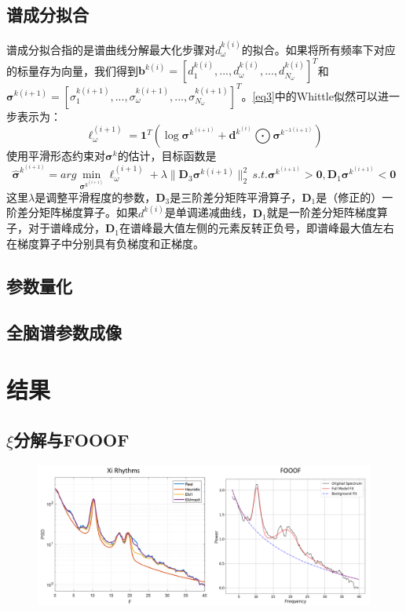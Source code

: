 \subsection{谱成分拟合}
谱成分拟合指的是谱曲线分解最大化步骤对$d_\omega^{k(i)}$的拟合。如果将所有频率下对应的标量存为向量，我们得到$\mathbf{b}^{k(i)}=[d_1^{k(i)},...,d_\omega^{k(i)},...,d_{N_\omega}^{k(i)}]^T$和$\mathbf{\sigma}^{k(i+1)}=[\sigma_1^{k(i+1)},...,\sigma_\omega^{k(i+1)},...,\sigma_{N_\omega}^{k(i+1)}]^T$。\eqref{eq3}中的Whittle似然可以进一步表示为：
\begin{equation}\label{eq11}
\ell_\omega^(i+1)=\mathbf{1}^T(\log{\mathbf{\sigma}}^{k^(i+1)}+\mathbf{d}^{k^(i)}\bigodot{\mathbf{\sigma}^{k^{-1(i+1)}}})
\end{equation}
使用平滑形态约束对$\mathbf{\sigma}^k$的估计，目标函数是
\begin{equation}\label{eq12}
\hat{\mathbf{\sigma}}^{k^(i+1)}=arg\min_{\mathbf{\sigma}^{k^(i+1)}}\ell_\omega^(i+1)+\lambda\lVert\mathbf{D}_3\mathbf{\sigma}^{k(i+1)}\rVert_2^2\,s.t.\mathbf{\sigma}^{k^(i+1)}>\mathbf{0},\mathbf{D}_1\mathbf{\sigma}^{k^(i+1)}<\mathbf{0}
\end{equation}
这里$\lambda$是调整平滑程度的参数，$\mathbf{D}_3$是三阶差分矩阵平滑算子，$\mathbf{D}_1$是（修正的）一阶差分矩阵梯度算子。如果$d^{k(i)}$是单调递减曲线，$\mathbf{D}_1$就是一阶差分矩阵梯度算子，对于谱峰成分，$\mathbf{D}_1$在谱峰最大值左侧的元素反转正负号，即谱峰最大值左右在梯度算子中分别具有负梯度和正梯度。

\subsection{参数量化}

\subsection{全脑谱参数成像}

\section{结果}
\subsection{$\xi$分解与FOOOF}
\begin{figure}[!ht]
	\includegraphics[width=15cm]{pic/xipi/figure3.png}
	\caption{}
	\label{fig3}
\end{figure}
